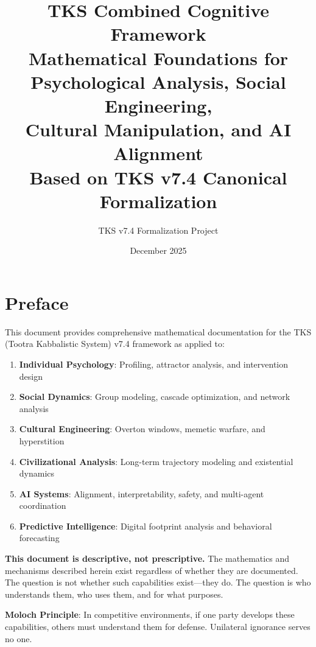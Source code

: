 \documentclass[11pt,twoside]{book}
\theoremstyle{definition}
\theoremstyle{plain}
\theoremstyle{remark}
\begin{document}
\title{\Huge\textbf{TKS Combined Cognitive Framework} \\[1em]
\LARGE Mathematical Foundations for \\
Psychological Analysis, Social Engineering, \\
Cultural Manipulation, and AI Alignment \\[1em]
\Large Based on TKS v7.4 Canonical Formalization}
\author{TKS v7.4 Formalization Project}
\date{December 2025}
\maketitle

\tableofcontents

\chapter*{Preface}

\begin{tcolorbox}[colback=gray!10!white,colframe=gray!75!black,title=\textbf{Document Scope and Intent},breakable]
This document provides comprehensive mathematical documentation for the TKS (Tootra Kabbalistic System) v7.4 framework as applied to:

\begin{enumerate}
    \item \textbf{Individual Psychology}: Profiling, attractor analysis, and intervention design
    \item \textbf{Social Dynamics}: Group modeling, cascade optimization, and network analysis
    \item \textbf{Cultural Engineering}: Overton windows, memetic warfare, and hyperstition
    \item \textbf{Civilizational Analysis}: Long-term trajectory modeling and existential dynamics
    \item \textbf{AI Systems}: Alignment, interpretability, safety, and multi-agent coordination
    \item \textbf{Predictive Intelligence}: Digital footprint analysis and behavioral forecasting
\end{enumerate}

\textbf{This document is descriptive, not prescriptive.} The mathematics and mechanisms described herein exist regardless of whether they are documented. The question is not whether such capabilities exist---they do. The question is who understands them, who uses them, and for what purposes.

\textbf{Moloch Principle}: In competitive environments, if one party develops these capabilities, others must understand them for defense. Unilateral ignorance serves no one.
\end{tcolorbox}
\end{document}
